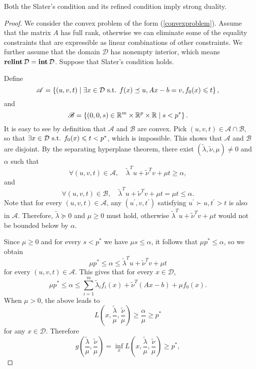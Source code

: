 \documentclass[12pt]{article}
\begin{document}
\begin{theorem}
    Both the Slater's condition and its refined condition imply strong duality.
\end{theorem}
\begin{proof}
    We consider the convex problem of the form (\ref{convexproblem}). Assume that the matrix \(A\) has full rank, otherwise we can eliminate some of the equality constraints that are expressible as linear combinations of other constraints. We further assume that the domain \(\mathcal D\) has nonempty interior, which means \(\operatorname{\mathbf{relint}} \mathcal D=\operatorname{\mathbf{int}} \mathcal D\). Suppose that Slater's condition holds.\par
    Define
    \[\mathscr A=\left\{(u,v,t)\mid \exists x\in \mathcal D\textnormal{ s.t. } f(x)\preceq u,Ax-b=v,f_0(x)\leqslant t\right\},\]
    and
    \[\mathscr B=\left\{(0,0,s)\in\mathbb R^m\times\mathbb R^p\times\mathbb R\mid s<p^\ast\right\}.\]
    It is easy to see by definition that \(\mathscr A\) and \(\mathscr B\) are convex. Pick \((u,v,t)\in\mathscr A\cap\mathscr B\), so that \(\exists x\in\mathcal D\textnormal{ s.t. } f_0(x)\leqslant t<p^\ast\), which is impossible. This shows that \(\mathscr A\) and \(\mathscr B\) are disjoint. By the separating hyperplane theorem, there exist \((\tilde\lambda,\tilde\nu,\mu)\neq 0\) and \(\alpha\) such that
    \[\forall (u,v,t)\in\mathscr A,\quad \tilde\lambda^Tu+\tilde\nu^Tv+\mu t\geqslant\alpha,\]
    and
    \[\forall (u,v,t)\in\mathscr B,\quad \tilde\lambda^Tu+\tilde\nu^Tv+\mu t=\mu t\leqslant\alpha.\]
    Note that for every \((u,v,t)\in\mathscr A\), any \((u^\prime,v,t^\prime)\) satisfying \(u^\prime\succ u,t^\prime>t\) is also in \(\mathscr A\). Therefore, \(\tilde\lambda\succeq 0\) and \(\mu\geqslant 0\) must hold, otherwise \(\tilde\lambda^Tu+\tilde\nu^Tv+\mu t\) would not be bounded below by \(\alpha\).\par
    Since \(\mu\geqslant 0\) and for every \(s<p^\ast\) we have \(\mu s\leqslant\alpha\), it follows that \(\mu p^\ast\leqslant\alpha\), so we obtain
    \[\mu p^\ast\leqslant\alpha\leqslant\tilde\lambda^Tu+\tilde\nu^Tv+\mu t\]
    for every \((u,v,t)\in\mathscr A\). This gives that for every \(x\in\mathcal D\),
    \[\mu p^\ast\leqslant\alpha\leqslant\sum_{i=1}^m\tilde\lambda_if_i(x)+\tilde\nu^T(Ax-b)+\mu f_0(x).\]
    When \(\mu>0\), the above leads to
    \[L\left(x,\frac{\tilde\lambda}{\mu},\frac{\tilde\nu}{\mu}\right)\geqslant\frac{\alpha}{\mu}\geqslant p^\ast\]
    for any \(x\in\mathcal D\). Therefore
    \[g\left(\frac{\tilde\lambda}{\mu},\frac{\tilde\nu}{\mu}\right)=\inf_x L\left(x,\frac{\tilde\lambda}{\mu},\frac{\tilde\nu}{\mu}\right)\geqslant p^\ast,\]

\end{proof}
\end{document}
